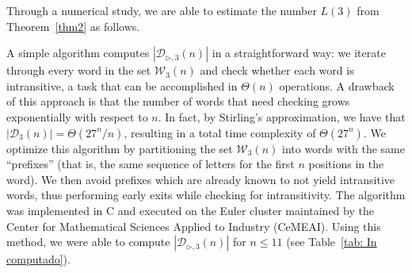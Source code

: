 \documentclass[reqno,a4paper,11pt]{amsart}
\newcommand{\btt}{\triangleright}
\theoremstyle{remark}
\newcommand{\mc}[1]{{\mathcal #1}}
\numberwithin{equation}{section}
\begin{document}
Through a numerical study, we are able to estimate the number $L(3)$ from Theorem~\ref{thm2} as follows.

A simple algorithm computes $|\mc D_{\btt, 3}(n)|$ in a straightforward way: we iterate through every word in the set $\mc W_3(n)$ and check whether each word is intransitive, a task that can be accomplished in $\Theta(n)$ operations. A drawback of this approach is that the number of words that need checking grows exponentially with respect to $n$. In fact, by Stirling's approximation, we have that $|\mc D_3(n)|=\Theta(27^n/n)$, resulting in a total time complexity of $\Theta(27^n)$. We optimize this algorithm by partitioning the set $\mc W_3(n)$ into words with the same ``prefixes'' (that is, the same sequence of letters for the first $n$ positions in the word). We then avoid prefixes which are already known to not yield intransitive words, thus performing early exits while checking for intransitivity. The algorithm was implemented in C\nolinebreak\hspace{-.05em}\raisebox{.4ex}{\tiny\bf +}\nolinebreak\hspace{-.10em}\raisebox{.4ex}{\tiny\bf +} and executed on the Euler cluster maintained by the Center for Mathematical Sciences Applied to Industry (CeMEAI). Using this method, we were able to compute $|\mc D_{\btt, 3}(n)|$ for $n\leq 11$ (see Table~\ref{tab: In computado}).
            \renewcommand{\arraystretch}{1.2}
\end{document}
